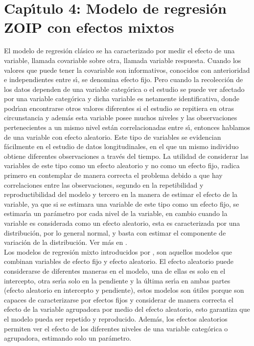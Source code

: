 \chapter{Cap\'{\i}tulo 4: Modelo de regresi\'{o}n ZOIP con efectos mixtos}\label{cap4}

El modelo de regresi\'{o}n cl\'{a}sico se ha caracterizado por medir el efecto de una variable, llamada covariable sobre otra, llamada variable respuesta. Cuando los valores que puede tener la covariable son informativos, conocidos con anterioridad e independientes entre s\'{\i}, se denomina efecto fijo. Pero cuando la recolecci\'{o}n de los datos dependen de una variable categ\'{o}rica o el estudio se puede ver afectado por una variable categ\'{o}rica y dicha variable es netamente identificativa, donde podr\'{\i}an encontrarse otros valores diferentes si el estudio se repitiera en otras circunstancia y adem\'{a}s esta variable posee muchos niveles y las observaciones pertenecientes a un mismo nivel est\'{a}n correlacionadas entre s\'{\i}, entonces hablamos de una variable con efecto aleatorio. Este tipo de variables se evidencian f\'{a}cilmente en el estudio de datos longitudinales, en el que un mismo individuo obtiene diferentes observaciones a trav\'{e}s del tiempo. La utilidad de considerar las variables de este tipo como un efecto aleatorio y no como un efecto fijo, radica primero en contemplar de manera correcta el problema debido a que hay correlaciones entre las observaciones, segundo en la repetibilidad y reproductibilidad del modelo y tercero en la manera de estimar el efecto de la variable, ya que si se estimara una variable de este tipo como un efecto fijo, se estimar\'{\i}a un par\'{a}metro por cada nivel de la variable, en cambio cuando la variable es considerada como un efecto aleatorio, esta es caracterizada por una distribuci\'{o}n, por lo general normal, y basta con estimar el componente de variaci\'{o}n de la distribuci\'{o}n. Ver m\'{a}s en \cite{Seoane1}.\\

Los modelos de regresi\'{o}n mixto introducidos por \cite{Laird1}, son aquellos modelos que combinan variables de efecto fijo y efecto aleatorio. El efecto aleatorio puede considerarse de diferentes maneras en el modelo, una de ellas es solo en el intercepto, otra ser\'{\i}a solo en la pendiente y la \'{u}ltima ser\'{\i}a en ambas partes (efecto aleatorio en intercepto y pendiente), estos modelos son \'{u}tiles porque son capaces de caracterizarse por efectos fijos y considerar de manera correcta el efecto de la variable agrupadora por medio del efecto aleatorio, esto garantiza que el modelo pueda ser repetido y reproducido. Adem\'{a}s, los efectos aleatorios permiten ver el efecto de los diferentes niveles de una variable categ\'{o}rica o agrupadora, estimando solo un par\'{a}metro.\\

